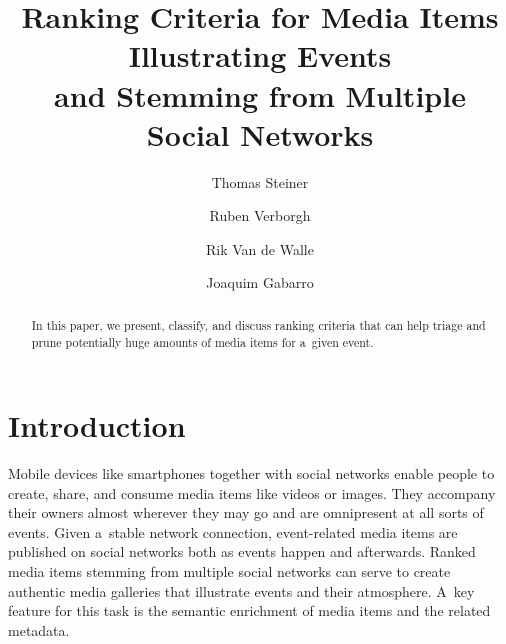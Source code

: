 \documentclass[runningheads,a4paper,11pt]{llncs}
\begin{document}
\mainmatter

\title{Ranking Criteria for Media Items Illustrating Events\\ and Stemming from Multiple Social Networks}

\renewcommand{\ttdefault}{pcr}
\renewcommand\UrlFont{\smaller\tt}

\author{Thomas Steiner \and Ruben Verborgh \and Rik Van de Walle \and Joaquim Gabarro}



\maketitle

\begin{abstract}
In this paper, we present, classify, and discuss ranking criteria that can help
triage and prune potentially huge amounts of media items for a~given event.
\end{abstract}

\section{Introduction}
Mobile devices like smartphones together with social networks
enable people to create, share, and consume media items
like videos or images.
They accompany their owners almost wherever they may go
and are omnipresent at all sorts of events.
Given a~stable network connection, event-related media items are published
on social networks both as events happen and afterwards.
Ranked media items stemming from multiple social networks
can serve to create authentic media galleries
that illustrate events and their atmosphere.
A~key feature for this task is the semantic enrichment of media items and the related metadata.
\end{document}
